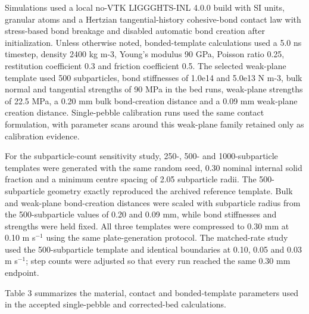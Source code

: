 \documentclass[5p,twocolumn]{elsarticle}
\begin{document}
Simulations used a local no-VTK LIGGGHTS-INL 4.0.0 build \cite{LIGGGHTSINL} with SI units, granular atoms and a Hertzian tangential-history cohesive-bond contact law with stress-based bond breakage and disabled automatic bond creation after initialization. Unless otherwise noted, bonded-template calculations used a 5.0 ns timestep, density 2400 kg m-3, Young's modulus 90 GPa, Poisson ratio 0.25, restitution coefficient 0.3 and friction coefficient 0.5. The selected weak-plane template used 500 subparticles, bond stiffnesses of 1.0e14 and 5.0e13 N m-3, bulk normal and tangential strengths of 90 MPa in the bed runs, weak-plane strengths of 22.5 MPa, a 0.20 mm bulk bond-creation distance and a 0.09 mm weak-plane creation distance. Single-pebble calibration runs used the same contact formulation, with parameter scans around this weak-plane family retained only as calibration evidence.


For the subparticle-count sensitivity study, 250-, 500- and 1000-subparticle templates were generated with the same random seed, 0.30 nominal internal solid fraction and a minimum centre spacing of 2.05 subparticle radii. The 500-subparticle geometry exactly reproduced the archived reference template. Bulk and weak-plane bond-creation distances were scaled with subparticle radius from the 500-subparticle values of 0.20 and 0.09 mm, while bond stiffnesses and strengths were held fixed. All three templates were compressed to 0.30 mm at 0.10 m s$^{-1}$ using the same plate-generation protocol. The matched-rate study used the 500-subparticle template and identical boundaries at 0.10, 0.05 and 0.03 m s$^{-1}$; step counts were adjusted so that every run reached the same 0.30 mm endpoint.


Table 3 summarizes the material, contact and bonded-template parameters used in the accepted single-pebble and corrected-bed calculations.
\end{document}
